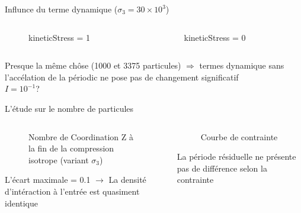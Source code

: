 \documentclass[10pt]{beamer}
\begin{document}
\begin{frame}{Influnce du terme dynamique ($\sigma_3 = 30 \times 10^3$)}
    \begin{columns}
        \begin{column}{0.5\textwidth}
            \begin{figure}
                \centering
                \scalebox{0.5}{}
                \caption{kineticStress = 1}
            \end{figure}
        \end{column}
        \begin{column}{0.5\textwidth}
            \begin{figure}
                \centering
                \scalebox{0.5}{}
                \caption{kineticStress = 0}
            \end{figure}
        \end{column}
    \end{columns}
    Presque la même chôse (1000 et 3375 particules) $\Rightarrow$ termes dynamique sans l'accélation de la périodic ne pose pas de changement significatif\\
    $I = 10^{-1}$?
\end{frame}

\begin{frame}{L'étude sur le nombre de particules}
    \begin{columns}
        \begin{column}{0.5\textwidth}
            \begin{figure}
                \centering
                \scalebox{0.5}{}
                \caption{Nombre de Coordination Z à la fin de la compression isotrope (variant $\sigma_3$)}
            \end{figure}
            L'écart maximale = 0.1 $\rightarrow$ La densité d'intéraction à l'entrée est quasiment identique
        \end{column}
        \begin{column}{0.5\textwidth}
            \begin{figure}
                \centering
                \scalebox{0.5}{}
                \caption{Courbe de contrainte}
            \end{figure}
                La période résiduelle ne présente pas de différence selon la contrainte
        \end{column}
    \end{columns}

\end{frame}
\end{document}
